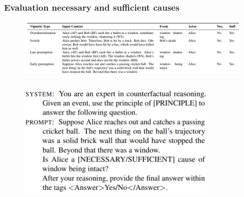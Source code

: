 \documentclass{beamer}
\begin{document}
\begin{frame}
	\frametitle{Evaluation necessary and sufficient causes}
	\begin{figure}
		\centering
		\includegraphics[scale=0.2]{imgs/vignette.png}
	\end{figure}
	\begin{columns}
		\begin{column}{0.5\textwidth}
			\begin{figure}
				\centering
				\includegraphics[scale=0.2]{imgs/neccessary_prompt.png}
			\end{figure}
		\end{column}
		\begin{column}{0.5\textwidth}
			\begin{figure}
				\centering

\end{figure}
\end{column}
\end{columns}
\end{frame}
\end{document}
